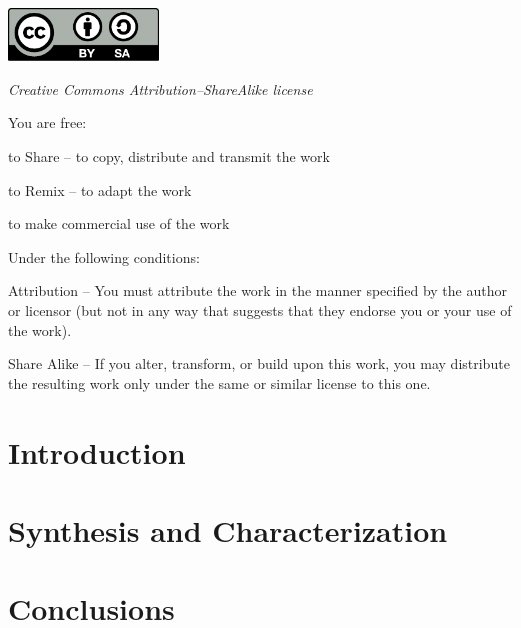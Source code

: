 \documentclass[a4paper,12pt,openright]{book}
\begin{document}
{
\newpage
\null\vfill
\begin{center}
\includegraphics[width=0.3\textwidth]{img/cc-by-sa.pdf}

\smallskip

\textit{Creative Commons Attribution--ShareAlike license}
\end{center}

\bigskip

\noindent
You are free:


to Share -- to copy, distribute and transmit the work
\indent

to Remix -- to adapt the work
\indent

to make commercial use of the work

\medskip

\noindent
Under the following conditions:

Attribution -- You must attribute the work in the manner specified by the author or licensor (but not in any way that suggests that they endorse you or your use of the work).
\indent

Share Alike -- If you alter, transform, or build upon this work, you may distribute the resulting work only under the same or similar license to this one. 
}

\mainmatter
\pagestyle{headings}
\chapter{Introduction}
\graphicspath{ {./img/intro/} }




\chapter{Synthesis and Characterization}
\graphicspath{ {./img/results/} }




\chapter{Conclusions}


\end{document}
